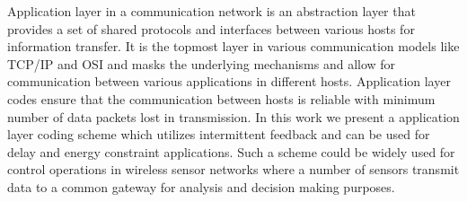 
Application layer in a communication network is an abstraction layer that provides a set of shared protocols and interfaces between various hosts for information transfer. It is the topmost layer in various communication models like TCP/IP and OSI and masks the underlying mechanisms and allow for communication between various applications in different hosts. Application layer codes ensure that the communication between hosts is reliable with minimum number of data packets lost in transmission. In this work we present a application layer coding scheme which utilizes intermittent feedback and can be used for delay and energy constraint applications. Such a scheme could be widely used for control operations in wireless sensor networks where a number of sensors transmit data to a common gateway for analysis and decision making purposes.

\newpage

